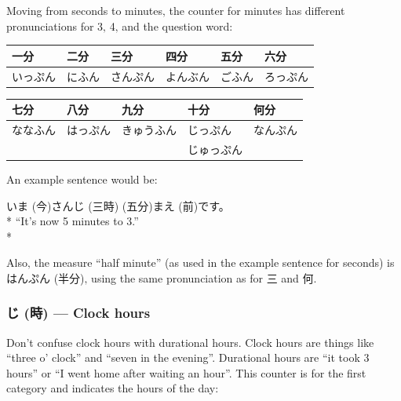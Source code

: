 \documentclass[11pt, b5paper, twoside, openright, onecolumn]{book}
\makeatletter
\newcommand*{\rubystack}[2]{{\relscale{0.5}%
  \begin{tabular}[b]{@{}c@{}}%
    {#1}\\%
   {\textscale{2}{#2}}%
  \end{tabular}}%
}
\DeclareRobustCommand*{\ruby}[2]{%
  \mbox{%
    \setlength{\parskip}{0ex}%
    \BeginAccSupp{method=pdfstringdef,ActualText={#1}}%
      \rubystack{\phantom{#2}}{#1}%
      \llap{%
        \rubystack{#2}{\phantom{#1}}%
      }%
    \EndAccSupp{}%
  }%
}
\renewcommand*{\ruby}[2]{#2 (#1)}%
\newenvironment{exampleblock}{
\setlength{\parindent}{0.6in}
\begin{minipage}[t]{\dimexpr\textwidth-\parindent}}
{\end{minipage}}
\newenvironment{mytabular}[1]{\noindent\hspace{0.4in}
\begin{tabular}[h]{#1}}{\end{tabular}}
\makeatother
\begin{document}
Moving from seconds to minutes‚ the counter for minutes has different pronunciations for 3‚ 4‚ and the question word:

\vspace{0.5cm}
\smaller
\begin{mytabular}{| l  l  l  l  l  l |}\hline 
\rule{0pt}{2.4ex}一分 & 二分 & 三分 & 四分 & 五分 & 六分\\ 
\hline
\rule{0pt}{2.4ex}いっぷん & にふん & さんぷん & よんぶん & ごふん & ろっぷん\\ 
\hline 
\end{mytabular}
\larger
\vspace{0.5cm}

\smaller
\begin{mytabular}{| l  l  l  l  l |}\hline 
\rule{0pt}{2.4ex}七分 & 八分 & 九分 & 十分 & 何分\\ 
\hline
\rule{0pt}{2.4ex}ななふん & はっぷん & きゅうふん & じっぷん & なんぷん\\ 
\rule{0pt}{2.4ex} &  &  & じゅっぷん & \\ 
\hline 
\end{mytabular}
\larger
\vspace{0.5cm}


An example sentence would be:

\vspace{0.4cm}
\begin{exampleblock}
\ruby{今}{いま}\ruby{三時}{さんじ}\ruby{五分}{}\ruby{前}{まえ}です。 \\* 
“It’s now 5 minutes to 3.” \\* 
\end{exampleblock}
\vspace{0.2cm}

Also‚ the measure “half minute” (as used in the example sentence for seconds) is \ruby{半分}{はんぷん}‚ using the same pronunciation as for 三 and 何.

\subsubsection{\ruby{時}{じ} — Clock hours}

Don’t confuse clock hours with durational hours. Clock hours are things like “three o’ clock” and “seven in the evening”. Durational hours are “it took 3 hours” or “I went home after waiting an hour”. This counter is for the first category and indicates the hours of the day:
\end{document}
